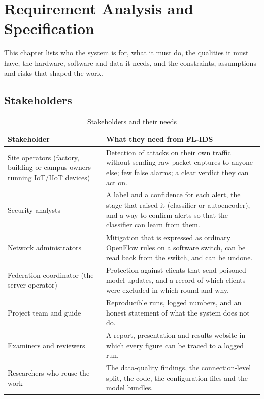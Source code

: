 \chapter{Requirement Analysis and Specification}\label{chap:req}
This chapter lists who the system is for, what it must do, the qualities it must have, the hardware, software and data it needs, and the constraints, assumptions and risks that shaped the work.

\section{Stakeholders}
\begin{table}[H]
\centering
\renewcommand{\arraystretch}{1.25}
\begin{tabular}{|>{\raggedright\arraybackslash}p{3.8cm}|>{\raggedright\arraybackslash}p{9.7cm}|}
\hline
\textbf{Stakeholder} & \textbf{What they need from FL-IDS} \\ \hline
Site operators (factory, building or campus owners running IoT/IIoT devices) & Detection of attacks on their own traffic without sending raw packet captures to anyone else; few false alarms; a clear verdict they can act on. \\ \hline
Security analysts & A label and a confidence for each alert, the stage that raised it (classifier or autoencoder), and a way to confirm alerts so that the classifier can learn from them. \\ \hline
Network administrators & Mitigation that is expressed as ordinary OpenFlow rules on a software switch, can be read back from the switch, and can be undone. \\ \hline
Federation coordinator (the server operator) & Protection against clients that send poisoned model updates, and a record of which clients were excluded in which round and why. \\ \hline
Project team and guide & Reproducible runs, logged numbers, and an honest statement of what the system does not do. \\ \hline
Examiners and reviewers & A report, presentation and results website in which every figure can be traced to a logged run. \\ \hline
Researchers who reuse the work & The data-quality findings, the connection-level split, the code, the configuration files and the model bundles. \\ \hline
\end{tabular}
\caption{Stakeholders and their needs}
\end{table}


